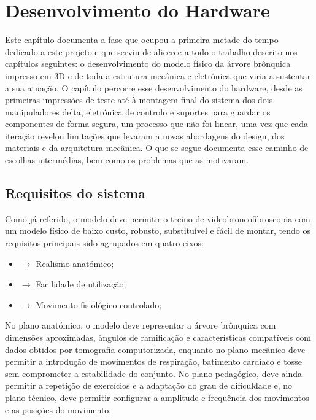 \chapter{Desenvolvimento do Hardware}
\setlength{\parskip}{\baselineskip}

Este capítulo documenta a fase que ocupou a primeira metade do tempo dedicado a este projeto e que serviu de alicerce a todo o trabalho descrito nos capítulos seguintes: o desenvolvimento do modelo físico da árvore brônquica impresso em 3D e de toda a estrutura mecânica e eletrónica que viria a sustentar a sua atuação. O capítulo percorre esse desenvolvimento do hardware, desde as primeiras impressões de teste até à montagem final do sistema dos dois manipuladores delta, eletrónica de controlo e suportes para guardar os componentes de forma segura, um processo que não foi linear, uma vez que cada iteração revelou limitações que levaram a novas abordagens do design, dos materiais e da arquitetura mecânica. O que se segue documenta esse caminho de escolhas intermédias, bem como os problemas que as motivaram.

\section{Requisitos do sistema}
Como já referido, o modelo deve permitir o treino de videobroncofibroscopia com um modelo físico de baixo custo, robusto, substituível e fácil de montar, tendo os requisitos principais sido agrupados em quatro eixos:
\begin{itemize}
  \item $\rightarrow$ Realismo anatómico;
  \item $\rightarrow$ Facilidade de utilização;
  \item $\rightarrow$ Movimento fisiológico controlado;
\end{itemize}

No plano anatómico, o modelo deve representar a árvore brônquica com dimensões aproximadas, ângulos de ramificação e características compatíveis com dados obtidos por tomografia computorizada, enquanto no plano mecânico deve permitir a introdução de movimentos de respiração, batimento cardíaco e tosse sem comprometer a estabilidade do conjunto. 
No plano pedagógico, deve ainda permitir a repetição de exercícios e a adaptação do grau de dificuldade e, no plano técnico, deve permitir configurar a amplitude e frequência dos movimentos e as posições do movimento.

